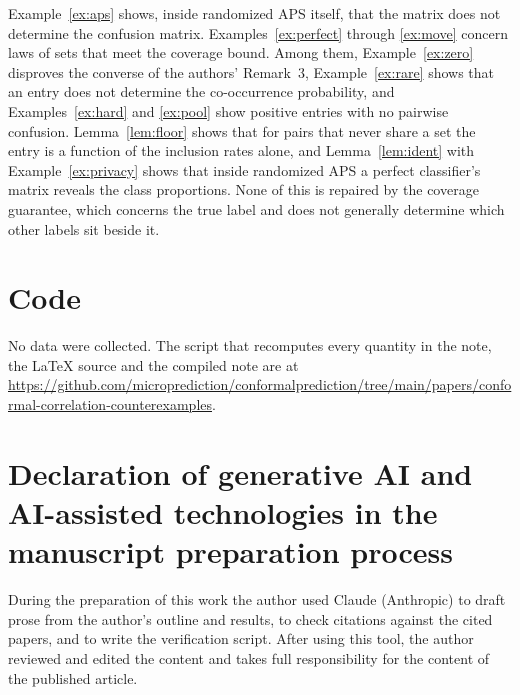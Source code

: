 \documentclass[11pt]{article}
\theoremstyle{definition}
\theoremstyle{definition}
\theoremstyle{remark}
\begin{document}
Example~\ref{ex:aps} shows, inside randomized APS itself, that the matrix does not determine the
confusion matrix. Examples~\ref{ex:perfect} through \ref{ex:move} concern laws of sets that meet the
coverage bound. Among them, Example~\ref{ex:zero} disproves the converse of the authors' Remark~3,
Example~\ref{ex:rare} shows that an entry does not determine the co-occurrence probability, and
Examples~\ref{ex:hard} and \ref{ex:pool} show positive entries with no pairwise confusion.
Lemma~\ref{lem:floor} shows that for pairs that never share a set the entry is a function of the
inclusion rates alone, and Lemma~\ref{lem:ident} with Example~\ref{ex:privacy} shows that inside
randomized APS a perfect classifier's matrix reveals the class proportions. None of this is repaired by the coverage guarantee, which concerns the true label and does not
generally determine which other labels sit beside it.

\section*{Code}

No data were collected. The script that recomputes every quantity in the note, the \LaTeX{} source
and the compiled note are at
\url{https://github.com/microprediction/conformalprediction/tree/main/papers/conformal-correlation-counterexamples}.

\section*{Declaration of generative AI and AI-assisted technologies in the manuscript preparation process}

During the preparation of this work the author used Claude (Anthropic) to draft prose from the
author's outline and results, to check citations against the cited papers, and to write the
verification script. After using this tool, the author reviewed and edited the content and takes
full responsibility for the content of the published article.
\end{document}
